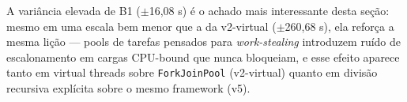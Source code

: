 A variância elevada de B1 ($\pm$16,08 s) é o achado mais interessante
desta seção: mesmo em uma escala bem menor que a da v2-virtual
($\pm$260,68 s), ela reforça a mesma lição --- pools de tarefas
pensados para \textit{work-stealing} introduzem ruído de escalonamento
em cargas CPU-bound que nunca bloqueiam, e esse efeito aparece tanto em
virtual threads sobre \texttt{ForkJoinPool} (v2-virtual) quanto em
divisão recursiva explícita sobre o mesmo framework (v5).
